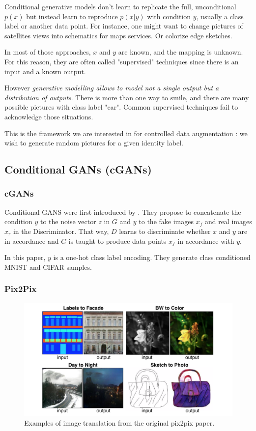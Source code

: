 Conditional generative models don't learn to replicate the full, unconditional $p(x)$ but instead learn to reproduce $p(x | y)$ with condition $y$, usually a class label or another data point. For instance, one might want to change pictures of satellites views into schematics for maps services. Or colorize edge sketches.

In most of those approaches, $x$ and $y$ are known, and the mapping is unknown. For this reason, they are often called "supervised" techniques since there is an input and a known output.

However \emph{generative modelling allows to model not a single output but a distribution of outputs}. There is more than one way to smile, and there are many possible pictures with class label "car". Common supervised techniques fail to acknowledge those situations.

This is the framework we are interested in for controlled data augmentation : we wish to generate random pictures for a given identity label. 

\subsection{Conditional GANs (cGANs)}

\subsubsection{cGANs}

Conditional GANS were first introduced by \citet{cgan}. They propose to concatenate the condition $y$ to the noise vector $z$ in $G$ and $y$ to the fake images $x_f$ and  real images $x_r$ in the Discriminator. That way, $D$ learns to discriminate whether $x$ and $y$ are in accordance and $G$ is taught to produce data points $x_f$ in accordance with $y$.

In this paper, $y$ is a one-hot class label encoding. They generate class conditioned MNIST and CIFAR samples.

\subsubsection{Pix2Pix}

\begin{figure}
    \centering
    \includegraphics[width=\columnwidth]{60-files/pix2pix.png}
    \caption{Examples of image translation from the original pix2pix paper.}
    \label{fig:pix2pix}
\end{figure}

